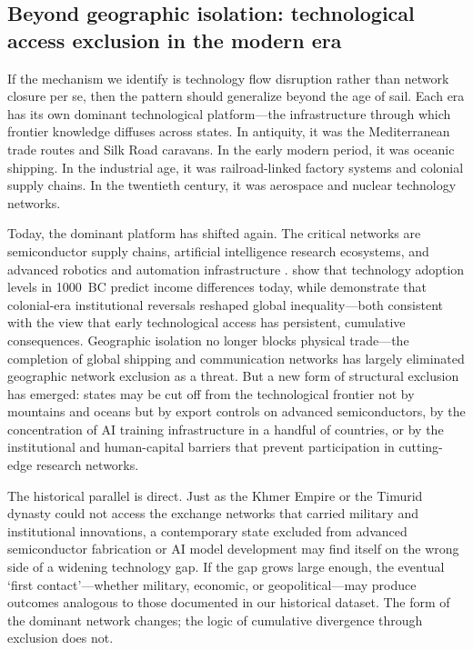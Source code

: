 \documentclass[pdflatex,sn-basic]{sn-jnl}
\theoremstyle{thmstyleone}%
\theoremstyle{thmstyletwo}%
\theoremstyle{thmstylethree}%
\begin{document}
\subsection{Beyond geographic isolation: technological access exclusion in the modern era}\label{sec:disc-modern}

If the mechanism we identify is technology flow disruption rather than network closure per se, then the pattern should generalize beyond the age of sail. Each era has its own dominant technological platform---the infrastructure through which frontier knowledge diffuses across states. In antiquity, it was the Mediterranean trade routes and Silk Road caravans. In the early modern period, it was oceanic shipping. In the industrial age, it was railroad-linked factory systems and colonial supply chains. In the twentieth century, it was aerospace and nuclear technology networks.

Today, the dominant platform has shifted again. The critical networks are semiconductor supply chains, artificial intelligence research ecosystems, and advanced robotics and automation infrastructure \citep{AcemogluRestrepo2020, CominMestieri2018}. \citet{CominEasterlyGong2010} show that technology adoption levels in 1000~BC predict income differences today, while \citet{AcemogluJohnsonRobinson2002} demonstrate that colonial-era institutional reversals reshaped global inequality---both consistent with the view that early technological access has persistent, cumulative consequences. Geographic isolation no longer blocks physical trade---the completion of global shipping and communication networks has largely eliminated geographic network exclusion as a threat. But a new form of structural exclusion has emerged: states may be cut off from the technological frontier not by mountains and oceans but by export controls on advanced semiconductors, by the concentration of AI training infrastructure in a handful of countries, or by the institutional and human-capital barriers that prevent participation in cutting-edge research networks.

The historical parallel is direct. Just as the Khmer Empire or the Timurid dynasty could not access the exchange networks that carried military and institutional innovations, a contemporary state excluded from advanced semiconductor fabrication or AI model development may find itself on the wrong side of a widening technology gap. If the gap grows large enough, the eventual `first contact'---whether military, economic, or geopolitical---may produce outcomes analogous to those documented in our historical dataset. The form of the dominant network changes; the logic of cumulative divergence through exclusion does not.
\end{document}
